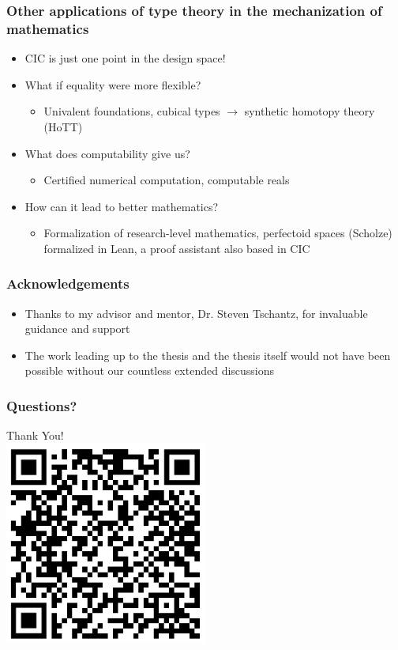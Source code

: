 \documentclass{beamer}
\begin{document}
\begin{frame}
\frametitle{Other applications of type theory in the mechanization of mathematics}
\begin{itemize}
\item CIC is just one point in the design space!
\item What if equality were more flexible?
  \begin{itemize}
  \item Univalent foundations, cubical types $\to$ synthetic homotopy
    theory (HoTT)
  \end{itemize}
\item What does computability give us?
  \begin{itemize}
  \item Certified numerical computation, computable reals
  \end{itemize}
\item How can it lead to better mathematics?
  \begin{itemize}
  \item Formalization of research-level mathematics, perfectoid spaces
    (Scholze) formalized in Lean, a proof assistant also based in CIC
  \end{itemize}
\end{itemize}
\end{frame}

\begin{frame}
\frametitle{Acknowledgements}
\begin{itemize}
\item Thanks to my advisor and mentor, Dr. Steven Tschantz, for
  invaluable guidance and support
\item The work leading up to the thesis and the thesis itself would
  not have been possible without our countless extended discussions
\end{itemize}
\end{frame}

\begin{frame}
\frametitle{Questions?}
\centering
\Huge{Thank You!}\\
\vspace{0.5cm}
\includegraphics[width=0.5\textwidth]{./images/qr.png}
\end{frame}
\end{document}
